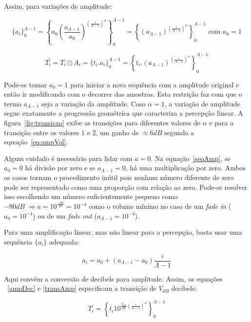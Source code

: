 Assim, para variações de amplitude:

\begin{equation}\label{seqAmp}
\{a_i\}_0^{\Lambda-1}=\left \{ a_0 \left ( \frac{a_{\Lambda-1}}{a_0} \right )^{\left ( \frac{i}{\Lambda-1} \right )^\alpha} \right \}_0^{\Lambda-1}=\left \{ \left ( {a_{\Lambda-1}} \right )^{\left ( \frac{i}{\Lambda-1} \right )^\alpha} \right \}_0^{\Lambda-1} \text{ com } a_0=1
\end{equation}

\begin{equation}\label{transAmp}
T_i^{'}=T_i \odot A_i = \{t_i . a_i\}_0^{\Lambda-1}=\left \{ t_i . (a_{\Lambda-1} )^{\left ( \frac{i}{\Lambda-1} \right )^\alpha} \right \}_0^{\Lambda-1}
\end{equation}

Pode-se tomar $a_0=1$ para iniciar a nova sequência com a amplitude original e então ir modificando com o decorrer das amostras.
Esta restrição faz com que o termo $a_{\Lambda-1}$ seja a variação da amplitude.
Caso $\alpha=1$, a variação de amplitude segue exatamente a progressão geométrica que caracteriza
a percepção linear. A figura~\ref{fig:transicao} exibe as transições para diferentes valores de $\alpha$ e para a transição entre os valores $1$ e $2$, um ganho de $\approx 6dB$ segundo a equação~\ref{eq:ampVol}.


Algum cuidado é necessário para lidar com $a=0$.
Na equação~\ref{seqAmp}, se $a_0=0$ há divisão por zero e
se $a_{\Lambda-1}=0$, há uma multiplicação por zero. Ambos os casos
tornam o procedimento inútil pois nenhum número diferente de zero pode ser representado como uma proporção com relação ao zero. Pode-se resolver isso escolhendo um número suficientemente pequeno como $-80dB\;\Rightarrow a=10^{\frac{-80}{20}}=10^{-4}$ como o volume mínimo no caso de um
\emph{fade in} ($a_0=10^{-4}$) ou de um \emph{fade out} ($a_{\Lambda-1}=10^{-4}$).


Para uma amplificação linear, mas não linear para a percepção, basta usar uma sequência $\{a_i\}$ adequada:

\begin{equation}\label{seqAmpLin}
a_i=a_0 + (a_{\Lambda-1}-a_0)\frac{i}{\Lambda-1}
\end{equation}

Aqui convém a conversão de decibels para amplitude. Assim, as equações ~\ref{ampDec} e \ref{transAmp}
especificam a transição de $V_{dB}$ decibels:

\begin{equation}\label{seqAmpDB}
T_i^{'}=\left\{ t_i 10^{\frac{V_{dB}}{20}\left( \frac{i}{\Lambda-1} \right)^\alpha} \right\}_0^{\Lambda-1}
\end{equation}

